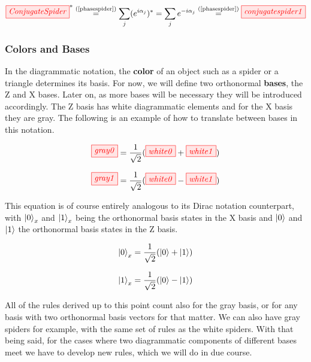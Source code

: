 \documentclass[]{article}
\newcommand{\equaltext}[1]{\ensuremath{\stackrel{\text{#1}}{=}}}
\begin{document}
\begin{equation}
\label{equation:conjugatespider}
\tikzfig{ConjugateSpider}^* \equaltext{(\ref{phasespider})} \sum\limits_{j}(e^{i\alpha_j})^*= \sum\limits_{j}e^{-i\alpha_j} \equaltext{(\ref{phasespider})} \tikzfig{conjugatespider1}
\end{equation}

\subsubsection{Colors and Bases}
\label{coloursandbases}

In the diagrammatic notation, the \textbf{color} of an object such as a spider or a triangle determines its basis. For now, we will define two orthonormal \textbf{bases}, the Z and X bases. Later on, as more bases will be necessary they will be introduced accordingly. The Z basis has white diagrammatic elements and for the X basis they are gray. The following is an example of how to translate between bases in this notation.

\begin{equation}
\label{equation:gray0}
\tikzfig{gray0} =\frac{1}{\sqrt{2}}( \tikzfig{white0} + \tikzfig{white1})
\end{equation}

\begin{equation}
\label{equation:gray1}
\tikzfig{gray1} =\frac{1}{\sqrt{2}}( \tikzfig{white0} - \tikzfig{white1})
\end{equation}

This equation is of course entirely analogous to its Dirac notation counterpart, with $\ket{0}_x$ and $\ket{1}_x$ being the orthonormal basis states in the X basis and $\ket{0}$ and $\ket{1}$ the orthonormal basis states in the Z basis.

\begin{equation}
\ket{0}_x = \frac{1}{\sqrt{2}}(\ket{0} + \ket{1})
\end{equation}

\begin{equation}
\ket{1}_x = \frac{1}{\sqrt{2}}(\ket{0} - \ket{1})
\end{equation}

All of the rules derived up to this point count also for the gray basis, or for any basis with two orthonormal basis vectors for that matter. We can also have gray spiders for example, with the same set of rules as the white spiders. With that being said, for the cases where two diagrammatic components of different bases meet we have to develop new rules, which we will do in due course. 
\end{document}
